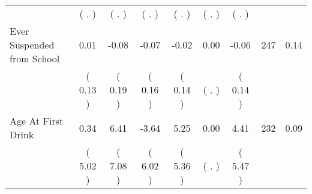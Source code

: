 \begin{tabular}{lcccccccc}
 & (        . ) & (        . ) & (        . ) & (        . ) & (        . ) & (        . ) & \\
Ever Suspended from School &      0.01 &     -0.08 &     -0.07 &     -0.02 &      0.00 &     -0.06 & 247 &       0.14 \\ 
 & (     0.13 ) & (     0.19 ) & (     0.16 ) & (     0.14 ) & (        . ) & (     0.14 ) & \\
Age At First Drink &      0.34 &      6.41 &     -3.64 &      5.25 &      0.00 &      4.41 & 232 &       0.09 \\ 
 & (     5.02 ) & (     7.08 ) & (     6.02 ) & (     5.36 ) & (        . ) & (     5.47 ) & \\
\bottomrule
\end{tabular}
